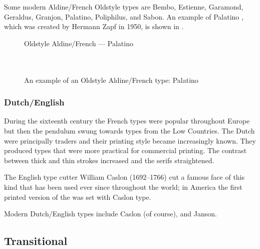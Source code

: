 \documentclass[10pt,letterpaper,extrafontsizes]{memoir}
\begin{document}
    Some modern Aldine/French Oldstyle types are 
Bembo, 
Estienne, 
Garamond, 
Geraldus, 
Granjon,
Palatino,  
Poliphilus, 
and Sabon.
An example of Palatino%
, 
which was created by Hermann Zapf
in 1950, is shown in .

\begin{figure}
\centering
{\centering{}\selectfont
  Oldstyle Aldine/French --- Palatino \\
  \UCalphabet \\
  \LCalphabet \\
  \fox\par}
\caption{An example of an Oldstyle Aldine/French type: Palatino} 
   \label{fig:palatino}
\end{figure}


\subsubsection{Dutch/English}

    During the sixteenth century the French types were popular throughout
Europe but then the pendulum swung towards types from the Low Countries.
The Dutch were principally traders and their printing style became 
increasingly known. They produced types that were more practical for
commercial printing. The contrast between thick and thin strokes increased
and the serifs straightened.

The English type cutter William Caslon (1692--1766) 
cut a famous face of this kind that has been used ever since throughout the 
world; in America the first printed version of the 
was set with Caslon type.

    Modern Dutch/English types include
Caslon (of course),
and Janson.

\subsection{Transitional}
\end{document}

